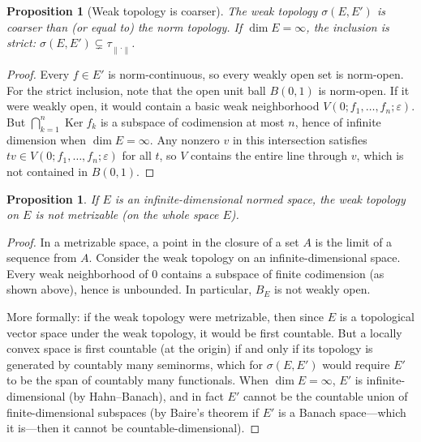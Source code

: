 \documentclass[a4paper,12pt]{book}
\DeclareMathOperator{\Ker}{Ker}
\newcommand{\norm}[1]{\left\| #1 \right\|}
\theoremstyle{definition}
\theoremstyle{plain}
\newtheorem{proposition}[definition]{Proposition}
\theoremstyle{remark}
\begin{document}
\begin{proposition}[Weak topology is coarser]\label{prop:weak-coarser}
The weak topology $\sigma(E,E')$ is coarser than (or equal to) the norm topology.
If $\dim E = \infty$, the inclusion is strict: $\sigma(E,E') \subsetneq \tau_{\norm{\cdot}}$.
\end{proposition}

\begin{proof}
Every $f\in E'$ is norm-continuous, so every weakly open set is norm-open.
For the strict inclusion, note that the open unit ball $B(0,1)$ is norm-open.
If it were weakly open, it would contain a basic weak neighborhood
$V(0;f_1,\ldots,f_n;\varepsilon)$.  But
$\bigcap_{k=1}^n \Ker f_k$ is a subspace of codimension at most $n$, hence
of infinite dimension when $\dim E=\infty$.  Any nonzero $v$ in this
intersection satisfies $tv\in V(0;f_1,\ldots,f_n;\varepsilon)$ for all $t$,
so $V$ contains the entire line through $v$, which is not contained in
$B(0,1)$.
\end{proof}

\begin{proposition}\label{prop:weak-non-metrizable}
If $E$ is an infinite-dimensional normed space, the weak topology on $E$ is
not metrizable (on the whole space $E$).
\end{proposition}

\begin{proof}
In a metrizable space, a point in the closure of a set $A$ is the limit of a
sequence from $A$.  Consider the weak topology on an infinite-dimensional space.
Every weak neighborhood of $0$ contains a subspace of finite codimension
(as shown above), hence is unbounded.  In particular, $B_E$ is not weakly
open.

More formally: if the weak topology were metrizable, then since $E$ is a
topological vector space under the weak topology, it would be first countable.
But a locally convex space is first countable (at the origin) if and only if
its topology is generated by countably many seminorms, which for $\sigma(E,E')$
would require $E'$ to be the span of countably many functionals.  When
$\dim E = \infty$, $E'$ is infinite-dimensional (by Hahn--Banach), and in fact
$E'$ cannot be the countable union of finite-dimensional subspaces (by Baire's
theorem if $E'$ is a Banach space---which it is---then it cannot be countable-dimensional).
\end{proof}
\end{document}
